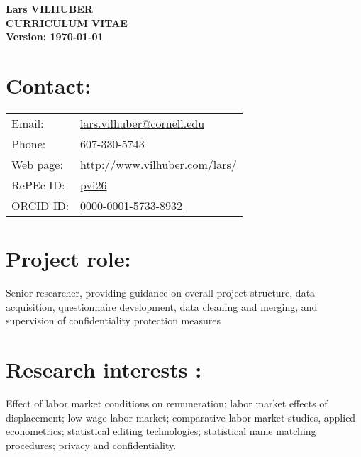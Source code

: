 \documentclass[12pt,letterpaper]{report}
\newcommand{\myversion}{\today}
\begin{document}
\thispagestyle{empty}
\begin{center}
  \large \bf Lars VILHUBER\\
  \large \bf \href{http://www.vilhuber.com/lars/academia/cv}{CURRICULUM VITAE}\\
\small Version: \myversion
\end{center}


\section*{Contact:}
  
\begin{tabular}{lp{4in}}
Email: &\href{mailto:lars.vilhuber@cornell.edu}{lars.vilhuber@cornell.edu}\\
Phone: &607-330-5743\\
Web page:&  \href{http://www.vilhuber.com/lars/}{http://www.vilhuber.com/lars/}\\
RePEc ID:& \href{https://ideas.repec.org/e/pvi26.html}{pvi26}\\
ORCID ID:& \href{http://orcid.org/0000-0001-5733-8932}{0000-0001-5733-8932}\\
\end{tabular}


\section*{ Project role:}
 Senior researcher, providing guidance on overall project structure, data acquisition, questionnaire development, data cleaning and merging, and supervision of confidentiality protection measures\\

\section*{Research interests :}
  Effect of labor market conditions on remuneration; 
   labor market effects of displacement;
   low wage labor market;
   comparative labor market studies,
   applied econometrics;
   statistical editing technologies;
   statistical name matching procedures;
   privacy and confidentiality.
\end{document}
